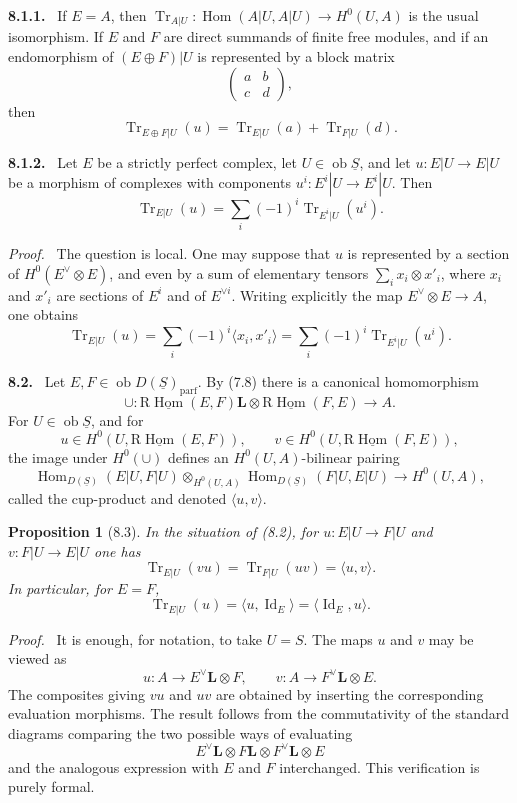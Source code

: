 \documentclass[13pt]{extarticle}
\newcommand{\uS}{\underline S}
\newcommand{\Tr}{\operatorname{Tr}}
\newcommand{\ob}{\operatorname{ob}}
\newcommand{\Hom}{\operatorname{Hom}}
\newcommand{\RHom}{\mathrm R\underline{\operatorname{Hom}}}
\newcommand{\bbL}{\mathbin{\mathbf L\!\otimes}}
\newenvironment{statement}[1]{\par\medskip\noindent\textbf{#1.}\ }{\par\medskip}
\newenvironment{prooftext}[1][Proof]{\par\noindent\emph{#1.}\ }{\par\medskip}
\newtheorem*{proposition*}{Proposition}
\begin{document}
\begin{statement}{8.1.1}
If $E=A$, then $\Tr_{A|U}:\Hom(A|U,A|U)\to H^0(U,A)$ is the usual isomorphism. If $E$ and $F$ are direct summands of finite free modules, and if an endomorphism of $(E\oplus F)|U$ is represented by a block matrix
\[
\begin{pmatrix}a&b\\ c&d\end{pmatrix},
\]
then
\[
\Tr_{E\oplus F|U}(u)=\Tr_{E|U}(a)+\Tr_{F|U}(d).
\]
\end{statement}

\begin{statement}{8.1.2}
Let $E$ be a strictly perfect complex, let $U\in\ob\uS$, and let $u:E|U\to E|U$ be a morphism of complexes with components $u^i:E^i|U\to E^i|U$. Then
\[
\Tr_{E|U}(u)=\sum_i(-1)^i\Tr_{E^i|U}(u^i).
\]
\end{statement}

\begin{prooftext}
The question is local. One may suppose that $u$ is represented by a section of $H^0(E^\vee\otimes E)$, and even by a sum of elementary tensors $\sum_i x_i\otimes x'_i$, where $x_i$ and $x'_i$ are sections of $E^i$ and of $E^{\vee i}$. Writing explicitly the map $E^\vee\otimes E\to A$, one obtains
\[
\Tr_{E|U}(u)=\sum_i(-1)^i\langle x_i,x'_i\rangle
=\sum_i(-1)^i\Tr_{E^i|U}(u^i).
\]
\end{prooftext}

\begin{statement}{8.2}
Let $E,F\in\ob D(\uS)_{\mathrm{parf}}$. By (7.8) there is a canonical homomorphism
\[
\cup:\RHom(E,F)\bbL\RHom(F,E)\longrightarrow A.
\]
For $U\in\ob\uS$, and for
\[
u\in H^0(U,\RHom(E,F)),\qquad
v\in H^0(U,\RHom(F,E)),
\]
the image under $H^0(\cup)$ defines an $H^0(U,A)$-bilinear pairing
\[
\Hom_{D(\uS)}(E|U,F|U)\otimes_{H^0(U,A)}
\Hom_{D(\uS)}(F|U,E|U)
\longrightarrow H^0(U,A),
\]
called the cup-product and denoted $\langle u,v\rangle$.
\end{statement}

\begin{proposition*}[8.3]
In the situation of (8.2), for $u:E|U\to F|U$ and $v:F|U\to E|U$ one has
\[
\Tr_{E|U}(vu)=\Tr_{F|U}(uv)=\langle u,v\rangle.
\]
In particular, for $E=F$,
\[
\Tr_{E|U}(u)=\langle u,\operatorname{Id}_E\rangle
=\langle\operatorname{Id}_E,u\rangle.
\]
\end{proposition*}

\begin{prooftext}
It is enough, for notation, to take $U=S$. The maps $u$ and $v$ may be viewed as
\[
u:A\to E^\vee\bbL F,
\qquad
v:A\to F^\vee\bbL E.
\]
The composites giving $vu$ and $uv$ are obtained by inserting the corresponding evaluation morphisms. The result follows from the commutativity of the standard diagrams comparing the two possible ways of evaluating
\[
E^\vee\bbL F\bbL F^\vee\bbL E
\]
and the analogous expression with $E$ and $F$ interchanged. This verification is purely formal.
\end{prooftext}
\end{document}
